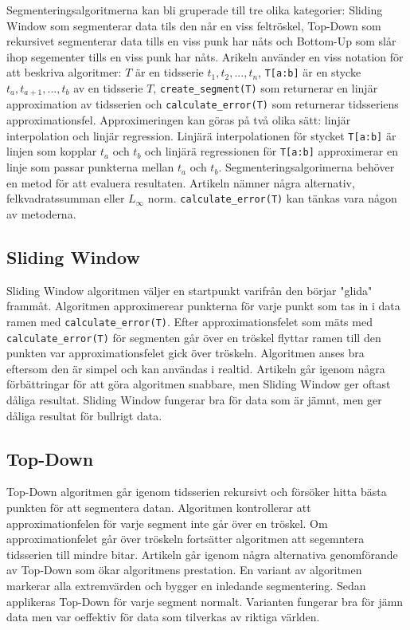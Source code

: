 \documentclass{article}
\newcommand{\tssubset}{\texttt{T[a:b]}}
\newcommand{\csegment}{\texttt{create_segment(T)}}
\newcommand{\calcerr}{\texttt{calculate_error(T)}}
\begin{document}
Segmenteringsalgoritmerna kan bli gruperade till tre olika kategorier: Sliding Window som segmenterar data tils den når en viss feltröskel, Top-Down som rekursivet segmenterar data tills en viss punk har nåts och Bottom-Up som slår ihop segementer tills en viss punk har nåts. Arikeln använder en viss notation för att beskriva algoritmer: $T$ är en tidsserie $t_1, t_2, ..., t_n$, \tssubset{} är en stycke $t_a, t_{a+1}, ..., t_b$ av en tidsserie $T$, \csegment{} som returnerar en linjär approximation av tidsserien och \calcerr{} som returnerar tidsseriens approximationsfel. Approximeringen kan göras på två olika sätt: linjär interpolation och linjär regression. Linjärä interpolationen för stycket \tssubset{} är linjen som kopplar $t_a$ och $t_b$ och linjärä regressionen för \tssubset{} approximerar en linje som passar punkterna mellan $t_a$ och $t_b$. Segmenteringsalgorimerna behöver en metod för att evaluera resultaten. Artikeln nämner några alternativ, felkvadratssumman eller $L_\infty$ norm. \calcerr{} kan tänkas vara någon av metoderna.
\bigskip

\subsection{Sliding Window}

Sliding Window algoritmen väljer en startpunkt varifrån den börjar "glida" frammåt. Algoritmen approximerear punkterna för varje punkt som tas in i data ramen med \calcerr{}. Efter approximationsfelet som mäts med \calcerr{} för segmenten går över en tröskel flyttar ramen till den punkten var approximationsfelet gick över tröskeln. Algoritmen anses bra eftersom den är simpel och kan användas i realtid. Artikeln går igenom några förbättringar för att göra algoritmen snabbare, men Sliding Window ger oftast dåliga resultat. Sliding Window fungerar bra för data som är jämnt, men ger dåliga resultat för bullrigt data.

\subsection{Top-Down}

Top-Down algoritmen går igenom tidsserien rekursivt och försöker hitta bästa punkten för att segmentera datan. Algoritmen kontrollerar att approximationfelen för varje segment inte går över en tröskel. Om approximationfelet går över tröskeln fortsätter algoritmen att segemntera tidsserien till mindre bitar. Artikeln går igenom några alternativa genomförande av Top-Down som ökar algoritmens prestation. En variant av algoritmen markerar alla extremvärden och bygger en inledande segmentering. Sedan applikeras Top-Down för varje segment normalt. Varianten fungerar bra för jämn data men var oeffektiv för data som tilverkas av riktiga världen.
\end{document}
